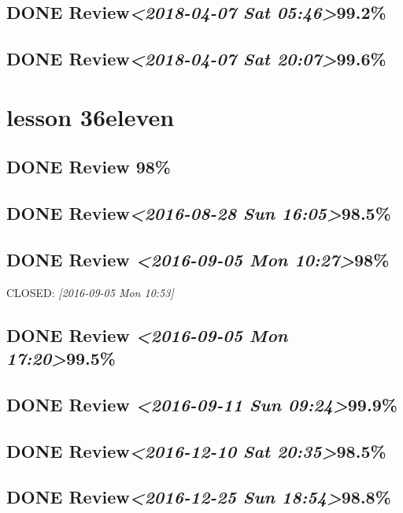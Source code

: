 \documentclass[11pt]{ctexart}
\begin{document}
\subsection{{\bfseries\sffamily DONE} Review\textit{<2018-04-07 Sat 05:46>}99.2\%}
\label{sec:org238d035}
\subsection{{\bfseries\sffamily DONE} Review\textit{<2018-04-07 Sat 20:07>}99.6\%}
\label{sec:orgeeb6483}
\section{lesson 36eleven}
\label{sec:orgcd9d389}
\subsection{{\bfseries\sffamily DONE} Review 98\%}
\label{sec:orge1f2a77}
\subsection{{\bfseries\sffamily DONE} Review\textit{<2016-08-28 Sun 16:05>}98.5\%}
\label{sec:org2d46ba4}

\subsection{{\bfseries\sffamily DONE} Review \textit{<2016-09-05 Mon 10:27>}98\%}
\label{sec:org4406c6a}

CLOSED: \textit{[2016-09-05 Mon 10:53]}
\subsection{{\bfseries\sffamily DONE} Review \textit{<2016-09-05 Mon 17:20>}99.5\%}
\label{sec:orgef7be45}
\subsection{{\bfseries\sffamily DONE} Review \textit{<2016-09-11 Sun 09:24>}99.9\%}
\label{sec:org368cf16}
\subsection{{\bfseries\sffamily DONE} Review\textit{<2016-12-10 Sat 20:35>}98.5\%}
\label{sec:org93a8e57}
\subsection{{\bfseries\sffamily DONE} Review\textit{<2016-12-25 Sun 18:54>}98.8\%}
\label{sec:org5dfb95c}
\end{document}
